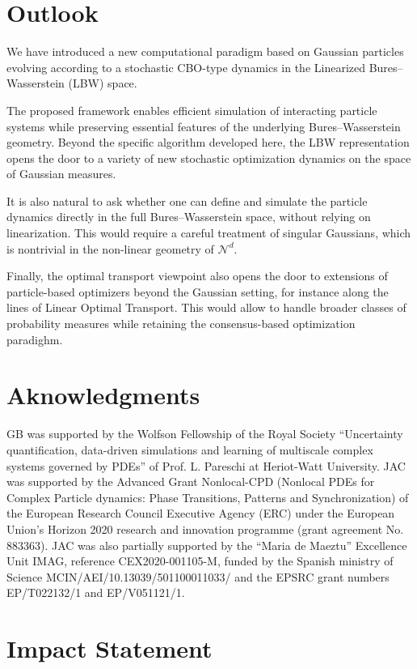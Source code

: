 \documentclass{article}
\theoremstyle{plain}
\theoremstyle{definition}
\theoremstyle{remark}
\begin{document}
\section{Outlook}
\label{sec:outlook}

We have introduced a new computational paradigm based on Gaussian particles evolving according to a stochastic CBO-type dynamics in the Linearized Bures--Wasserstein (LBW) space.
  
The proposed framework enables efficient simulation of interacting particle systems while preserving essential features of the underlying Bures--Wasserstein geometry.  
Beyond the specific algorithm developed here, the LBW representation opens the door to a variety of new stochastic optimization dynamics on the space of Gaussian measures.

It is also natural to ask whether one can define and simulate the particle dynamics directly in the full Bures--Wasserstein space, without relying on linearization.  
This would require a careful treatment of singular Gaussians, which is nontrivial in the non-linear geometry of $\mathcal{N}^d$.  

Finally, the optimal transport viewpoint also opens the door to extensions of particle-based optimizers beyond the Gaussian setting, for instance along the lines of Linear Optimal Transport. 
This would allow to handle broader classes of probability measures while retaining the consensus-based optimization paradighm.


\section*{Aknowledgments}

GB was supported by the Wolfson Fellowship of the Royal Society “Uncertainty quantification, data-driven simulations and learning of multiscale complex systems governed by PDEs” of Prof. L. Pareschi at Heriot-Watt University. JAC was supported by the Advanced Grant Nonlocal-CPD (Nonlocal PDEs for Complex Particle dynamics: Phase Transitions, Patterns and Synchronization) of the European Research Council Executive Agency (ERC) under the European Union’s Horizon 2020 research and innovation programme (grant agreement No. 883363). JAC was also partially supported by the “Maria de Maeztu” Excellence Unit IMAG, reference CEX2020-001105-M, funded by the Spanish ministry of Science MCIN/AEI/10.13039/501100011033/ and the EPSRC grant numbers EP/T022132/1 and EP/V051121/1.

\section*{Impact Statement}
\end{document}
